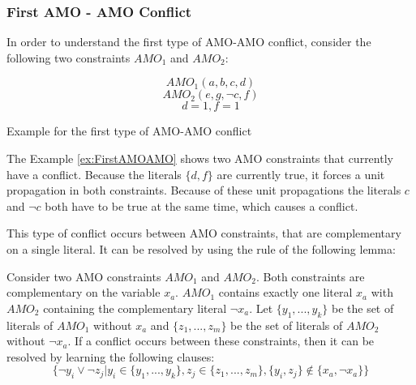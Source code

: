 \subsubsection{First AMO - AMO Conflict}

In order to understand the first type of AMO-AMO conflict, consider the following two constraints $AMO_1$ and $AMO_2$:

\begin{example}
\begin{leftbar}
\begin{displaymath}
AMO_1(a,b,c,d)
\end{displaymath}
\begin{displaymath}
AMO_2(e,g,\neg c,f)
\end{displaymath}
\begin{displaymath}
d = 1, f = 1
\end{displaymath}
\end{leftbar}
\caption{Example for the first type of AMO-AMO conflict}
\label{ex:FirstAMOAMO}
\end{example}

The Example \ref{ex:FirstAMOAMO} shows two AMO constraints that currently have a conflict. Because the literals $\{d,f\}$ are currently true, it forces a unit propagation in both constraints. Because of these unit propagations the literals $c$ and $\neg c$ both have to be true at the same time, which causes a conflict.

This type of conflict occurs between AMO constraints, that are complementary on a single literal. It can be resolved by using the rule of the following lemma:

\begin{lemma}
\begin{leftbar}
Consider two AMO constraints $AMO_1$ and $AMO_2$. Both constraints are complementary on the variable $x_a$. $AMO_1$ contains exactly one literal $x_a$ with $AMO_2$ containing the complementary literal $\neg x_a$. Let $\{y_1,...,y_k\}$ be the set of literals of $AMO_1$ without $x_a$ and $\{z_1,...,z_m\}$ be the set of literals of $AMO_2$ without $\neg x_a$. 
If a conflict occurs between these constraints, then it can be resolved by learning the following clauses:
\begin{displaymath}
\{\neg y_i \vee \neg z_j | y_i \in \{y_1,...,y_k\}, z_j \in \{z_1,...,z_m\}, \{y_i,z_j\} \not\in \{x_a, \neg x_a\}\}
\end{displaymath}
\end{leftbar}
\label{le:oneComplementary}
\end{lemma}

